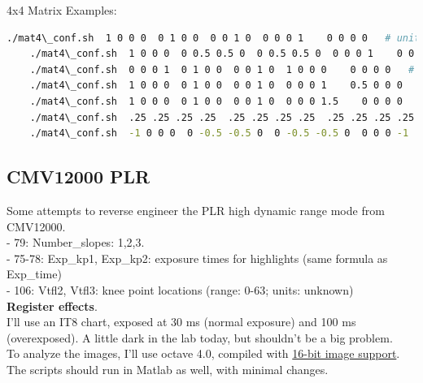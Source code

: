 4x4 Matrix Examples:

\begin{lstlisting}[language=bash,morekeywords=$,keywordstyle=\bfseries,frame=none,xleftmargin=.25in,belowskip=2em, aboveskip=2em]
    ./mat4\_conf.sh  1 0 0 0  0 1 0 0  0 0 1 0  0 0 0 1    0 0 0 0   # unity matrix but not optimal as both green channels are processed separately
    ./mat4\_conf.sh  1 0 0 0  0 0.5 0.5 0  0 0.5 0.5 0  0 0 0 1    0 0 0 0   # the two green channels inside each 2x2 pixel block are averaged and output on both green pixels
    ./mat4\_conf.sh  0 0 0 1  0 1 0 0  0 0 1 0  1 0 0 0    0 0 0 0   # red and blue are swapped
    ./mat4\_conf.sh  1 0 0 0  0 1 0 0  0 0 1 0  0 0 0 1    0.5 0 0 0    # red 50% brigther
    ./mat4\_conf.sh  1 0 0 0  0 1 0 0  0 0 1 0  0 0 0 1.5    0 0 0 0    # blue multiplied with factor 1.5
    ./mat4\_conf.sh  .25 .25 .25 .25  .25 .25 .25 .25  .25 .25 .25 .25  .25 .25 .25 .25    0 0 0 0    # black/white
    ./mat4\_conf.sh  -1 0 0 0  0 -0.5 -0.5 0  0 -0.5 -0.5 0  0 0 0 -1    1 1 1 1    # negative
\end{lstlisting}






\subsection{CMV12000 PLR}

Some attempts to reverse engineer the PLR high dynamic range mode from CMV12000.\\ 

- 79: Number\_slopes: 1,2,3.\\
- 75-78: Exp\_kp1, Exp\_kp2: exposure times for highlights (same formula as Exp\_time)\\
- 106: Vtfl2, Vtfl3: knee point locations (range: 0-63; units: unknown) \\


\textbf{Register effects}.\\

I'll use an IT8 chart, exposed at 30 ms (normal exposure) and 100 ms (overexposed). A little dark in the lab today, but shouldn't be a big problem.\\

To analyze the images, I'll use octave 4.0, compiled with \href{http://marcelojoeng.blogspot.co.uk/2012/11/compile-octave-using-1632-bits-colour.html}{16-bit image support}. The scripts should run in Matlab as well, with minimal changes.\\


